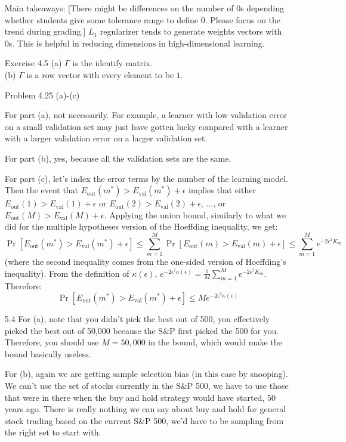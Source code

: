 \documentclass[10pt]{article}
\newcommand{\out}{\text{out}}
\newcommand{\val}{\text{val}}
\begin{document}
\begin{enumerate}
  Main takeaways: 
  [There might be differences on the number of 0s depending whether students give some tolerance range to define 0. Please focus on the trend during grading.]
  $L_1$ regularizer tends to generate weights vectors with 0s. 
  This is helpful in reducing dimensions in high-dimensional learning.

\item[Exercise 4.5] 
(a) $\Gamma$ is the identify matrix.\\
(b) $\Gamma$ is a row vector with every element to be $1$.


\item[Problem 4.25 (a)-(c)]

For part (a), not necessarily. For example, a learner with low
validation error on a small validation set may just have gotten lucky
compared with a learner with a larger validation error on a larger
validation set.

For part (b), yes, because all the validation sets are the same. 

For part (c), let's index the error terms by the number of the
learning model. Then the event that $E_{\out}(m^*) > E_{\val}(m^*) +
\epsilon$ implies that either $E_{\out}(1) > E_{\val}(1) + \epsilon$
or $E_{\out}(2) > E_{\val}(2) + \epsilon$, $\ldots$, or $E_{\out}(M) >
E_{\val}(M) + \epsilon$. Applying the union bound, similarly to what
we did for the multiple hypotheses version of the Hoeffding
inequality, we get:
\[ \Pr [E_{\out}(m^*) > E_{\val}(m^*) + \epsilon] \leq \sum_{m=1}^{M}
\Pr [E_{\out}(m) > E_{\val}(m) + \epsilon] \leq \sum_{m=1}^{M} e^{-2
  \epsilon^2 K_m} \]
(where the second inequality comes from the one-sided version of
Hoeffding's inequality). From the definition of $\kappa (\epsilon)$,
$e^{-2 \epsilon^2 \kappa(\epsilon)} = \frac{1}{M} \sum_{m=1}^{M} e^{-2
  \epsilon^2 K_m}$. Therefore:
\[ \Pr [E_{\out}(m^*) > E_{\val}(m^*) + \epsilon] \leq M e^{-2
  \epsilon^2 \kappa(\epsilon)} \]

     
\item[5.4]
For (a), note that you didn't pick the best out of 500, you
effectively picked the best out of 50,000 because the S\&P first picked
the 500 for you. Therefore, you should use $M=50,000$ in the bound,
which would make the bound basically useless.

For (b), again we are getting sample selection bias (in this case by
snooping). We can't use the set of stocks currently in the S\&P 500,
we have to use those that were in there when the buy and hold strategy
would have started, 50 years ago. There is really nothing we can say
about buy and hold for general stock trading based on the current S\&P
500, we'd have to be sampling from the right set to start with.



\end{enumerate}
\end{document}
